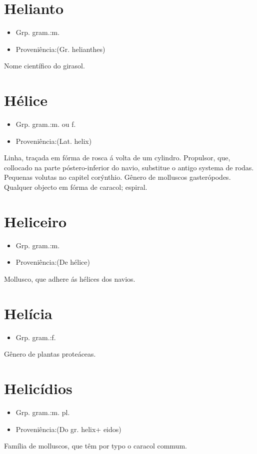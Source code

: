 \documentclass{article}
\begin{document}
\section{Helianto}
\begin{itemize}
\item {Grp. gram.:m.}
\end{itemize}
\begin{itemize}
\item {Proveniência:(Gr. \textunderscore helianthes\textunderscore )}
\end{itemize}
Nome científico do girasol.
\section{Hélice}
\begin{itemize}
\item {Grp. gram.:m.  ou  f.}
\end{itemize}
\begin{itemize}
\item {Proveniência:(Lat. \textunderscore helix\textunderscore )}
\end{itemize}
Linha, traçada em fórma de rosca á volta de um cylindro.
Propulsor, que, collocado na parte póstero-inferior do navio, substitue o antigo systema de rodas.
Pequenas volutas no capitel corýnthio.
Gênero de molluscos gasterópodes.
Qualquer objecto em fórma de caracol; espiral.
\section{Heliceiro}
\begin{itemize}
\item {Grp. gram.:m.}
\end{itemize}
\begin{itemize}
\item {Proveniência:(De \textunderscore hélice\textunderscore )}
\end{itemize}
Mollusco, que adhere ás hélices dos navios.
\section{Helícia}
\begin{itemize}
\item {Grp. gram.:f.}
\end{itemize}
Gênero de plantas proteáceas.
\section{Helicídios}
\begin{itemize}
\item {Grp. gram.:m. pl.}
\end{itemize}
\begin{itemize}
\item {Proveniência:(Do gr. \textunderscore helix\textunderscore  + \textunderscore eidos\textunderscore )}
\end{itemize}
Família de molluscos, que têm por typo o caracol commum.
\end{document}
